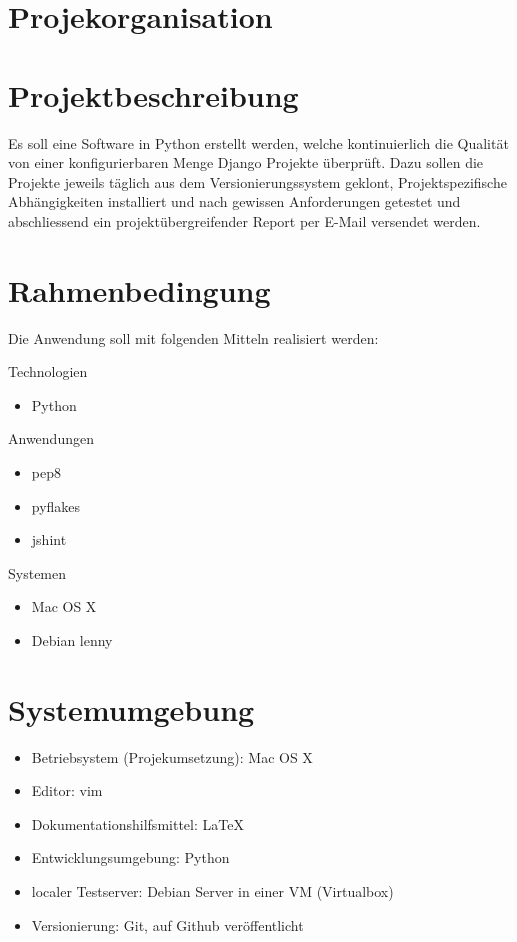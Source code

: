 \section{Projekorganisation}

\begin{figure}[!ht]
\begin{center}
\end{center}
\end{figure}

\section{Projektbeschreibung}
Es soll eine Software in Python erstellt werden, welche kontinuierlich die Qualität von einer konfigurierbaren Menge Django Projekte überprüft. Dazu sollen die Projekte jeweils täglich aus dem Versionierungssystem geklont, Projektspezifische Abhängigkeiten installiert und nach gewissen Anforderungen getestet und abschliessend ein projektübergreifender Report per E-Mail versendet werden.

\section{Rahmenbedingung}
Die Anwendung soll mit folgenden Mitteln realisiert werden:

Technologien
\begin{itemize}
    \item Python 

\end{itemize}

Anwendungen
\begin{itemize}
    \item pep8
    \item pyflakes
    \item jshint
\end{itemize}

Systemen
\begin{itemize}
    \item Mac OS X
    \item Debian lenny
\end{itemize}
    
\section{Systemumgebung}
\begin{itemize}
    \item Betriebsystem (Projekumsetzung): Mac OS X
    \item Editor: vim
    \item Dokumentationshilfsmittel: LaTeX
    \item Entwicklungsumgebung: Python
    \item localer Testserver: Debian Server in einer VM (Virtualbox) 
    \item Versionierung: Git, auf Github veröffentlicht
\end{itemize}

